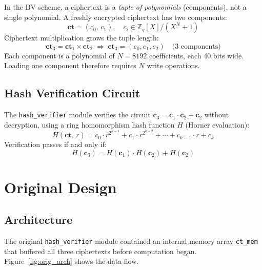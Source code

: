 \documentclass[12pt, a4paper]{article}
\begin{document}
In the BV scheme, a ciphertext is a \emph{tuple of polynomials}
(components), not a single polynomial. A freshly encrypted ciphertext
has two components:
\[
  \mathbf{ct} = (c_0,\, c_1), \quad c_i \in \mathbb{Z}_q[X]/(X^N+1)
\]
Ciphertext multiplication grows the tuple length:
\[
  \mathbf{ct}_3 = \mathbf{ct}_1 \times \mathbf{ct}_2
  \;\Rightarrow\;
  \mathbf{ct}_3 = (e_0, e_1, e_2) \quad \text{(3 components)}
\]
Each component is a polynomial of $N=8192$ coefficients, each 40 bits
wide. Loading one component therefore requires $N$ write operations.

\subsection{Hash Verification Circuit}

The \texttt{hash\_verifier} module verifies the circuit
$\mathbf{c}_3 = \mathbf{c}_1 \cdot \mathbf{c}_2 + \mathbf{c}_2$
without decryption, using a ring homomorphism hash function
$H$ (Horner evaluation):
\[
  H(\mathbf{ct},\, r) = c_0 \cdot r^{2^{k-1}} + c_1 \cdot r^{2^{k-2}}
  + \cdots + c_{k-1} \cdot r + c_k
\]
Verification passes if and only if:
\[
  H(\mathbf{c}_3) = H(\mathbf{c}_1) \cdot H(\mathbf{c}_2)
  + H(\mathbf{c}_2)
\]

\section{Original Design}
\label{sec:original}

\subsection{Architecture}

The original \texttt{hash\_verifier} module contained an internal
memory array \texttt{ct\_mem} that buffered all three ciphertexts
before computation began. Figure~\ref{fig:orig_arch} shows the data
flow.
\end{document}

